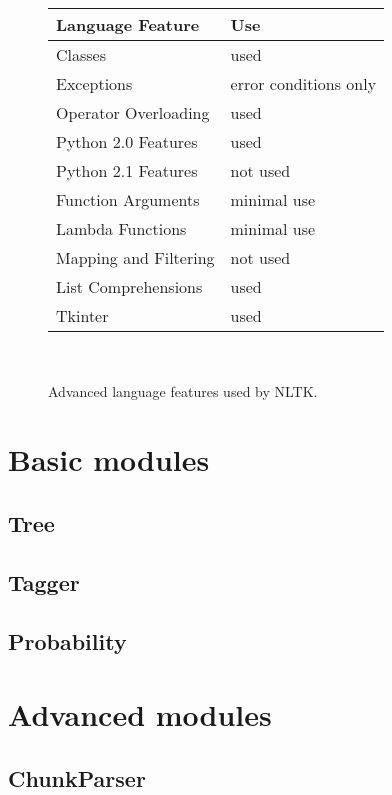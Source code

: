\documentclass[11pt]{article}
\begin{document}
\begin{figure}
\begin{centering}
\begin{tabular}{|l|l|}
\hline
\textbf{Language Feature} & \textbf{Use} \\
\hline
Classes & used \\
Exceptions & error conditions only \\
Operator Overloading & used \\
Python 2.0 Features & used \\
Python 2.1 Features & not used \\
Function Arguments & minimal use \\
Lambda Functions & minimal use \\
Mapping and Filtering & not used \\
List Comprehensions & used \\
Tkinter & used \\
\hline
\end{tabular}\\
\end{centering}
\caption{Advanced language features used by NLTK.}
\label{fig:feature}
\end{figure}

\section{Basic modules}

\subsection{Tree}

\subsection{Tagger}

\subsection{Probability}

\section{Advanced modules}

\subsection{ChunkParser}
\end{document}
